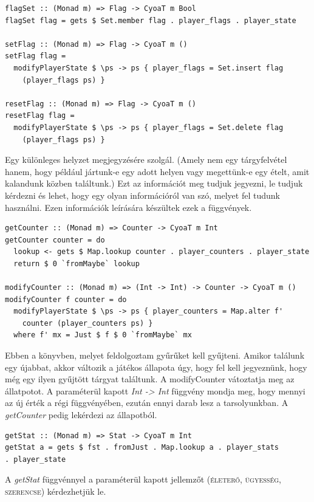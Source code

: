 \documentclass[12pt,a4paper,oneside]{report}
\newcommand{\stat}{\textsc}
\begin{document}
    \begin{verbatim}
flagSet :: (Monad m) => Flag -> CyoaT m Bool
flagSet flag = gets $ Set.member flag . player_flags . player_state

setFlag :: (Monad m) => Flag -> CyoaT m ()
setFlag flag =
  modifyPlayerState $ \ps -> ps { player_flags = Set.insert flag
    (player_flags ps) }

resetFlag :: (Monad m) => Flag -> CyoaT m ()
resetFlag flag =
  modifyPlayerState $ \ps -> ps { player_flags = Set.delete flag
    (player_flags ps) }
    \end{verbatim}
    Egy különleges helyzet megjegyzésére szolgál. (Amely nem egy
    tárgyfelvétel hanem, hogy például jártunk-e egy adott helyen vagy
    megettünk-e egy ételt, amit kalandunk közben találtunk.) Ezt az
    információt meg tudjuk jegyezni, le tudjuk kérdezni és lehet, hogy
    egy olyan információról van szó, melyet fel tudunk használni. Ezen
    információk leírására készültek ezek a függvények.

    \begin{verbatim}
getCounter :: (Monad m) => Counter -> CyoaT m Int
getCounter counter = do
  lookup <- gets $ Map.lookup counter . player_counters . player_state
  return $ 0 `fromMaybe` lookup

modifyCounter :: (Monad m) => (Int -> Int) -> Counter -> CyoaT m ()
modifyCounter f counter = do
  modifyPlayerState $ \ps -> ps { player_counters = Map.alter f'
    counter (player_counters ps) }
  where f' mx = Just $ f $ 0 `fromMaybe` mx
    \end{verbatim}
    Ebben a könyvben, melyet feldolgoztam gyűrűket kell
    gyűjteni. Amikor találunk egy újabbat, akkor változik a játékos
    állapota úgy, hogy fel kell jegyeznünk, hogy még egy ilyen
    gyűjtött tárgyat találtunk. A modifyCounter vátoztatja meg az
    állatpotot. A paraméterül kapott \emph{Int -> Int} függvény mondja meg,
    hogy mennyi az új érték a régi függvényében, ezután ennyi darab
    lesz a tarsolyunkban. A \emph{getCounter} pedig lekérdezi az állapotból.

    \begin{verbatim}
getStat :: (Monad m) => Stat -> CyoaT m Int
getStat a = gets $ fst . fromJust . Map.lookup a . player_stats
. player_state
    \end{verbatim}
    A \emph{getStat} függvénnyel a paraméterül kapott jellemzőt (\stat{életerő},
    \stat{ügyesség}, \stat{szerencse}) kérdezhetjük le.
\end{document}
